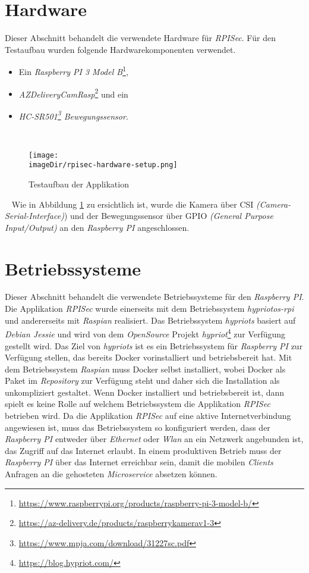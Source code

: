 \documentclass[]{article}
\newcommand{\imageDir}{images}
\begin{document}
\section{Hardware}
Dieser Abschnitt behandelt die verwendete Hardware für \emph{RPISec}. Für den Testaufbau wurden folgende Hardwarekomponenten verwendet.
\begin{itemize}
	\item Ein \emph{Raspberry PI 3 Model B}\footnote{\url{https://www.raspberrypi.org/products/raspberry-pi-3-model-b/}},
	\item \emph{AZDeliveryCamRasp}\footnote{\url{https://az-delivery.de/products/raspberrykamerav1-3}} und ein
	\item \emph{HC-SR501\footnote{\url{https://www.mpja.com/download/31227sc.pdf}} Bewegungssensor}.
\end{itemize}
\ \newpage
\begin{figure}[h]
	\centering
	\texttt{[image: \\imageDir/rpisec-hardware-setup.png]}
	\caption{Testaufbau der Applikation}
	\label{fig:image-hardware-setup}
\end{figure}
\ \newline
Wie in Abbildung \ref{fig:image-hardware-setup} zu ersichtlich ist, wurde die Kamera über CSI \emph{(Camera-Serial-Interface)}) und der Bewegungssensor über GPIO \emph{(General Purpose Input/Output)} an den \emph{Raspberry PI} angeschlossen.

\section{Betriebssysteme}
Dieser Abschnitt behandelt die verwendete Betriebssysteme für den \emph{Raspberry PI}. Die Applikation \emph{RPISec} wurde einerseits mit dem Betriebssystem \emph{hypriotos-rpi} und andererseits mit \emph{Raspian} realisiert. Das Betriebssystem \emph{hypriots} basiert auf \emph{Debian Jessie} und wird von dem \emph{OpenSource} Projekt \emph{hypriot}\footnote{\url{https://blog.hypriot.com/}} zur Verfügung gestellt wird. Das Ziel von \emph{hypriots} ist es ein Betriebssystem für \emph{Raspberry PI} zur Verfügung stellen, das bereits Docker vorinstalliert und betriebsbereit hat. Mit dem Betriebssystem \emph{Raspian} muss Docker selbst installiert, wobei Docker als Paket im \emph{Repository} zur Verfügung steht und daher sich die Installation als unkompliziert gestaltet.
\newline
\newline
Wenn Docker installiert und betriebsbereit ist, dann spielt es keine Rolle auf welchem Betriebssystem die Applikation \emph{RPISec} betrieben wird.
\newline
\newline
Da die Applikation \emph{RPISec} auf eine aktive Internetverbindung angewiesen ist, muss das Betriebssystem so konfiguriert werden, dass der \emph{Raspberry PI} entweder über \emph{Ethernet} oder \emph{Wlan} an ein Netzwerk angebunden ist, das Zugriff auf das Internet erlaubt. In einem produktiven Betrieb muss der \emph{Raspberry PI} über das Internet erreichbar sein, damit die mobilen \emph{Clients} Anfragen an die gehosteten \emph{Microservice} absetzen können.
\ \newpage
\end{document}
